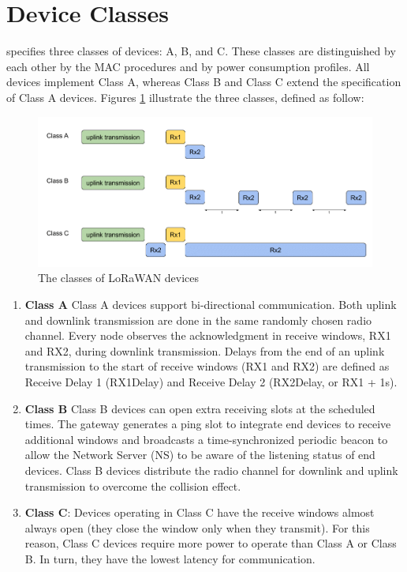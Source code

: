 \section{Device Classes}
\lorawan specifies three classes of devices: A, B, and C. These classes are distinguished by each other by the MAC procedures and by power consumption profiles. All devices implement Class A, whereas Class B and Class C extend the specification of Class A devices. Figures \ref{fig:classes} illustrate the three classes, defined as follow:

\begin{figure}
    \centering
    \includegraphics[width=0.7\linewidth]{images/lorawan/device_classes.png}
    \caption{The classes of LoRaWAN devices}
    \label{fig:classes}
\end{figure}

\begin{enumerate}

    \item \textbf{Class A} Class A devices support bi-directional communication. Both uplink and downlink transmission are done in the same randomly chosen radio channel. Every node observes the acknowledgment in receive windows, RX1 and RX2, during downlink transmission. Delays from the end of an uplink transmission to the start of receive windows (RX1 and RX2) are defined as Receive Delay 1 (RX1Delay) and Receive Delay 2 (RX2Delay, or RX1 + 1s).
    
    \item \textbf{Class B} Class B devices can open extra receiving slots at the scheduled times. The gateway generates a ping slot to integrate end devices to receive additional windows and broadcasts a time-synchronized periodic beacon to allow the Network Server (NS) to be aware of the listening status of end devices. Class B devices distribute the radio channel for downlink and uplink transmission to overcome the collision effect.
    
    \item \textbf{Class C}: Devices operating in Class C have the receive windows almost always open (they close the window only when they transmit). For this reason, Class C devices require more power to operate than Class A or Class B. In turn, they have the lowest latency for communication.
    
\end{enumerate}


